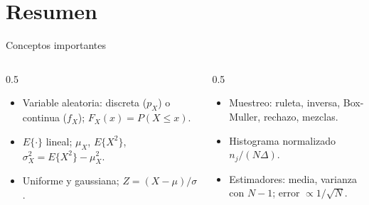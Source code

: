 \documentclass[aspectratio=169,11pt]{beamer}
\begin{document}
\section*{Resumen}
\begin{frame}{Conceptos importantes}
  \begin{columns}[T]
    \begin{column}{0.5\textwidth}
      \begin{itemize}
        \item Variable aleatoria: discreta ($p_X$) o continua ($f_X$); $F_X(x)=P(X\le x)$.
        \item $E\{\cdot\}$ lineal; $\mu_X$, $E\{X^2\}$, $\sigma_X^2=E\{X^2\}-\mu_X^2$.
        \item Uniforme y gaussiana; $Z=(X-\mu)/\sigma$.
      \end{itemize}
    \end{column}
    \begin{column}{0.5\textwidth}
      \begin{itemize}
        \item Muestreo: ruleta, inversa, Box-Muller, rechazo, mezclas.
        \item Histograma normalizado $n_j/(N\Delta)$.
        \item Estimadores: media, varianza con $N-1$; error $\propto1/\sqrt N$.
      \end{itemize}
    \end{column}
  \end{columns}
  \bigskip
\end{frame}
\end{document}
